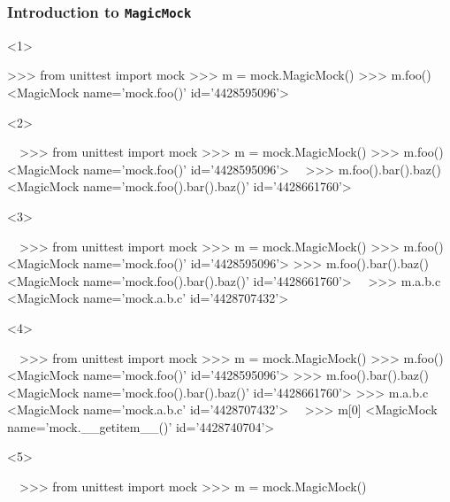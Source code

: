 \documentclass[xcolor={svgnames}]{beamer}
\newcommand{\ttcode}[2][]{\lstinline[style=plain,basicstyle=\ttfamily#1]{#2}}
\begin{document}
\begin{frame}[t,fragile]
    \frametitle{Introduction to \ttcode{MagicMock}}
    \begin{onlyenv}<1>
        \begin{pyenv}[gobble=12]
            >>> from unittest import mock
            >>> m = mock.MagicMock()
            >>> m.foo()
            <MagicMock name='mock.foo()' id='4428595096'>
        \end{pyenv}
    \end{onlyenv}
    \begin{onlyenv}<2>
        \begin{pyenv}[gobble=12]
            ~~>>> from unittest import mock
            >>> m = mock.MagicMock()
            >>> m.foo()
            <MagicMock name='mock.foo()' id='4428595096'>~~
            >>> m.foo().bar().baz()
            <MagicMock name='mock.foo().bar().baz()' id='4428661760'>
        \end{pyenv}
    \end{onlyenv}
    \begin{onlyenv}<3>
        \begin{pyenv}[gobble=12]
            ~~>>> from unittest import mock
            >>> m = mock.MagicMock()
            >>> m.foo()
            <MagicMock name='mock.foo()' id='4428595096'>
            >>> m.foo().bar().baz()
            <MagicMock name='mock.foo().bar().baz()' id='4428661760'>~~
            >>> m.a.b.c
            <MagicMock name='mock.a.b.c' id='4428707432'>
        \end{pyenv}
    \end{onlyenv}
    \begin{onlyenv}<4>
        \begin{pyenv}[gobble=12]
            ~~>>> from unittest import mock
            >>> m = mock.MagicMock()
            >>> m.foo()
            <MagicMock name='mock.foo()' id='4428595096'>
            >>> m.foo().bar().baz()
            <MagicMock name='mock.foo().bar().baz()' id='4428661760'>
            >>> m.a.b.c
            <MagicMock name='mock.a.b.c' id='4428707432'>~~
            >>> m[0]
            <MagicMock name='mock.__getitem__()' id='4428740704'>
        \end{pyenv}
    \end{onlyenv}
    \begin{onlyenv}<5>
        \begin{pyenv}[gobble=12]
            ~~>>> from unittest import mock
            >>> m = mock.MagicMock()

\end{pyenv}
\end{onlyenv}
\end{frame}
\end{document}
